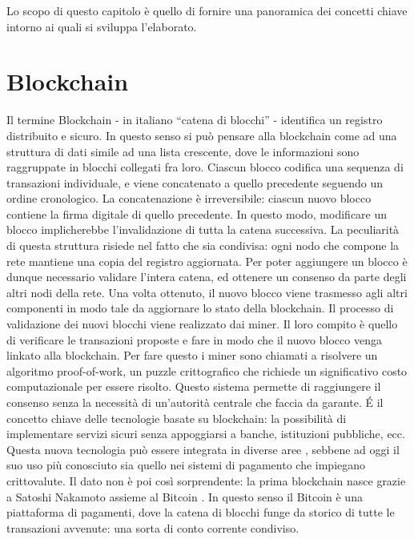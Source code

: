 
Lo scopo di questo capitolo è quello di fornire una panoramica dei concetti chiave intorno ai quali si sviluppa l'elaborato.

\section{Blockchain}

Il termine Blockchain - in italiano ``catena di blocchi'' - identifica un registro distribuito e sicuro. In questo senso si può pensare alla blockchain come ad una struttura di dati simile ad una lista crescente, dove le informazioni sono raggruppate in blocchi collegati fra loro.\newline
Ciascun blocco codifica una sequenza di transazioni individuale, e viene concatenato a quello precedente seguendo un ordine cronologico. La concatenazione è irreversibile: ciascun nuovo blocco contiene la firma digitale di quello precedente. In questo modo, modificare un blocco implicherebbe l'invalidazione di tutta la catena successiva.\newline  
La peculiarità di questa struttura risiede nel fatto che sia condivisa: ogni nodo che compone la rete mantiene una copia del registro aggiornata. Per poter aggiungere un blocco è dunque necessario validare l'intera catena, ed ottenere un consenso da parte degli altri nodi della rete. Una volta ottenuto, il nuovo blocco viene trasmesso agli altri componenti in modo tale da aggiornare lo stato della blockchain.\newline
Il processo di validazione dei nuovi blocchi viene realizzato dai miner.
Il loro compito è quello di verificare le transazioni proposte e fare in modo che il nuovo blocco venga linkato alla blockchain. Per fare questo i miner sono chiamati a risolvere un algoritmo proof-of-work, un puzzle crittografico che richiede un significativo costo computazionale per essere risolto.\newline
Questo sistema permette di raggiungere il consenso senza la necessità di un'autorità centrale che faccia da garante. \'E il concetto chiave delle tecnologie basate su blockchain: la possibilità di implementare servizi sicuri senza appoggiarsi a banche, istituzioni pubbliche, ecc.\newline
\newline
Questa nuova tecnologia può essere integrata in diverse aree \cite{K1}, sebbene ad oggi il suo uso più conosciuto sia quello nei sistemi di pagamento che impiegano crittovalute.
Il dato non è poi così sorprendente: la prima blockchain nasce grazie a Satoshi Nakamoto assieme al Bitcoin \cite{K2}. In questo senso il Bitcoin è una
piattaforma di pagamenti, dove la catena di blocchi funge da storico di tutte le transazioni avvenute: una sorta di conto corrente condiviso.\newline

